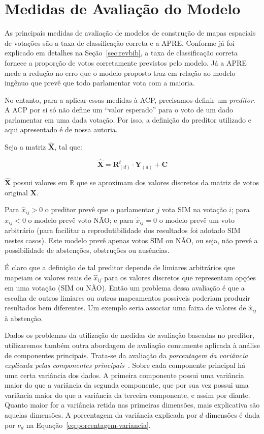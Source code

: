 \documentclass[a4paper, 12pt]{article}
\newcommand\nay{NÃO\xspace}
\newcommand\yea{SIM\xspace}
\begin{document}
\section{Medidas de Avaliação do Modelo}
\label{sec:avaliacao}

As principais medidas de avaliação de modelos de construção de mapas espaciais de votações são a taxa de classificação correta e a APRE. Conforme já foi explicado em detalhes na Seção~\ref{sec:revbib}, a taxa de classificação correta fornece a proporção de votos corretamente previstos pelo modelo. Já a APRE mede a redução no erro que o modelo proposto traz em relação ao modelo ingênuo que prevê que todo parlamentar vota com a maioria.

No entanto, para a aplicar essas medidas à ACP, precisamos definir um \emph{preditor}. A ACP por si só não define um ``valor esperado'' para o voto de um dado parlamentar em uma dada votação. Por isso, a definição do preditor utilizado e aqui apresentado é de nossa autoria.

Seja a matriz $\mathbf{\widehat{X}}$, tal que:

\begin{equation}
  \widehat{\mathbf{X}} = \mathbf{R}_{(d)}^{t} \cdot \mathbf{Y}_{(d)} + \mathbf{C}
\end{equation}

$\widehat{\mathbf{X}}$ possui valores em $\mathbb{R}$ que se aproximam dos valores discretos da matriz de votos original $\mathbf{X}$.

Para $\widehat{x}_{ij} > 0$ o preditor prevê que o parlamentar $j$ vota SIM na votação $i$; para $\widehat{x}_{ij} < 0$ o modelo prevê voto NÃO; e para $\widehat{x}_{ij} = 0$ o modelo prevê um voto arbitrário (para facilitar a reprodutibilidade dos resultados foi adotado SIM nestes casos). Este modelo prevê apenas votos \yea ou \nay, ou seja, não prevê a possibilidade de abstenções, obstruções ou ausências.

É claro que a definição de tal preditor depende de limiares arbitrários que mapeiam os valores reais de $\widehat{x}_{ij}$ para os valores discretos que representam opções em uma votação (\yea ou \nay). Então um problema dessa avaliação é que a escolha de outros limiares ou outros mapeamentos possíveis poderiam produzir resultados bem diferentes. Um exemplo seria associar uma faixa de valores de $\widehat{x}_{ij}$ à abstenção.

Dados os problemas da utilização de medidas de avaliação baseadas no preditor, utilizaremos também outra abordagem de avaliação comumente aplicada à análise de componentes principais. Trata-se da avaliação da \emph{porcentagem da variância explicada pelas componentes principais}~\cite{DataMining2003}. Sobre cada componente principal há uma certa variância dos dados. A primeira componente possui uma variância maior do que a variância da segunda componente, que por sua vez possui uma variância maior do que a variância da terceira componente, e assim por diante. Quanto maior for a variância retida nas primeiras dimensões, mais explicativa são aquelas dimensões. A porcentagem da variância explicada por $d$ dimensões é dada por $\nu_d$ na Equação~\ref{eq:porcentagem-variancia}.
\end{document}
